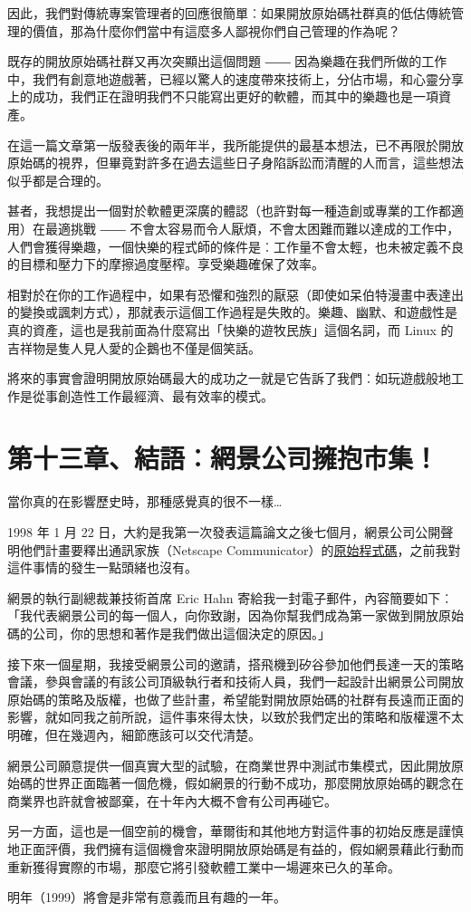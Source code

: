 \documentclass[12pt, a5paper]{book}
\begin{document}
因此，我們對傳統專案管理者的回應很簡單︰如果開放原始碼社群真的低估傳統管理的價值，那為什麼你們當中有這麼多人鄙視你們自己管理的作為呢？

既存的開放原始碼社群又再次突顯出這個問題 ――
因為樂趣在我們所做的工作中，我們有創意地遊戲著，已經以驚人的速度帶來技術上，分佔市場，和心靈分享上的成功，我們正在證明我們不只能寫出更好的軟體，而其中的樂趣也是一項資產。

在這一篇文章第一版發表後的兩年半，我所能提供的最基本想法，已不再限於開放原始碼的視界，但畢竟對許多在過去這些日子身陷訴訟而清醒的人而言，這些想法似乎都是合理的。

甚者，我想提出一個對於軟體更深廣的體認（也許對每一種造創或專業的工作都適用）在最適挑戰
――
不會太容易而令人厭煩，不會太困難而難以達成的工作中，人們會獲得樂趣，一個快樂的程式師的條件是︰工作量不會太輕，也未被定義不良的目標和壓力下的摩擦過度壓榨。享受樂趣確保了效率。

相對於在你的工作過程中，如果有恐懼和強烈的厭惡（即使如呆伯特漫畫中表達出的變換或諷刺方式），那就表示這個工作過程是失敗的。樂趣、幽默、和遊戲性是真的資產，這也是我前面為什麼寫出「快樂的遊牧民族」這個名詞，而
Linux 的吉祥物是隻人見人愛的企鵝也不僅是個笑話。

將來的事實會證明開放原始碼最大的成功之一就是它告訴了我們︰如玩遊戲般地工作是從事創造性工作最經濟、最有效率的模式。

\newpage
\section{第十三章、結語︰網景公司擁抱市集！}\label{ux7b2cux5341ux4e09ux7ae0ux7d50ux8a9eux7db2ux666fux516cux53f8ux64c1ux62b1ux5e02ux96c6}

當你真的在影響歷史時，那種感覺真的很不一樣\ldots{}

1998 年 1 月 22
日，大約是我第一次發表這篇論文之後七個月，網景公司公開聲明他們計畫要釋出通訊家族（Netscape
Communicator）的\href{http://www.netscape.com/newsref/pr/newsrelease558.html}{原始程式碼}，之前我對這件事情的發生一點頭緒也沒有。

網景的執行副總裁兼技術首席 Eric Hahn
寄給我一封電子郵件，內容簡要如下︰「我代表網景公司的每一個人，向你致謝，因為你幫我們成為第一家做到開放原始碼的公司，你的思想和著作是我們做出這個決定的原因。」

接下來一個星期，我接受網景公司的邀請，搭飛機到矽谷參加他們長達一天的策略會議，參與會議的有該公司頂級執行者和技術人員，我們一起設計出網景公司開放原始碼的策略及版權，也做了些計畫，希望能對開放原始碼的社群有長遠而正面的影響，就如同我之前所說，這件事來得太快，以致於我們定出的策略和版權還不太明確，但在幾週內，細節應該可以交代清楚。

網景公司願意提供一個真實大型的試驗，在商業世界中測試市集模式，因此開放原始碼的世界正面臨著一個危機，假如網景的行動不成功，那麼開放原始碼的觀念在商業界也許就會被鄙棄，在十年內大概不會有公司再碰它。

另一方面，這也是一個空前的機會，華爾街和其他地方對這件事的初始反應是謹慎地正面評價，我們擁有這個機會來證明開放原始碼是有益的，假如網景藉此行動而重新獲得實際的市場，那麼它將引發軟體工業中一場遲來已久的革命。

明年（1999）將會是非常有意義而且有趣的一年。
\end{document}
